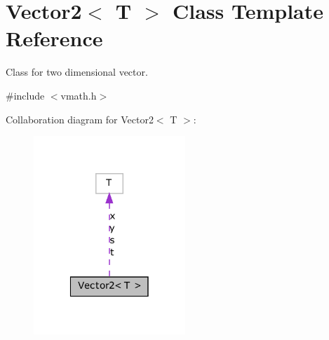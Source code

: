 \hypertarget{class_vector2}{
\section{Vector2$<$ T $>$ Class Template Reference}
\label{class_vector2}
}


Class for two dimensional vector.  




{\ttfamily \#include $<$vmath.h$>$}



Collaboration diagram for Vector2$<$ T $>$:
\nopagebreak
\begin{figure}[H]
\begin{center}
\leavevmode
\includegraphics[width=162pt]{class_vector2__coll__graph}
\end{center}
\end{figure}

